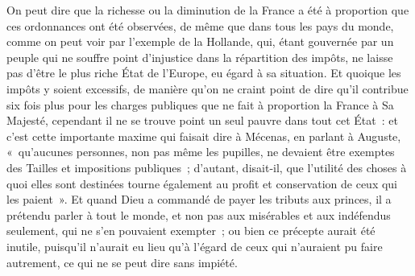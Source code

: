\documentclass[french,twoside]{book} %
\begin{document}
On peut dire que la richesse ou la diminution de la France a été à proportion que ces ordonnances ont été observées, de même que dans tous les pays du monde, comme on peut voir par l’exemple de la Hollande, qui, étant gouvernée par un peuple qui ne souffre point d’injustice dans la répartition des impôts, ne laisse pas d’être le plus riche État de l’Europe, eu égard à sa situation. Et quoique les impôts y soient excessifs, de manière qu’on ne craint point de dire qu’il contribue six fois plus pour les charges publiques que ne fait à proportion la France à Sa Majesté, cependant il ne se trouve point un seul pauvre dans tout cet État : et c’est cette importante maxime qui faisait dire à Mécenas, en parlant à Auguste, « qu’aucunes personnes, non pas même les pupilles, ne devaient être exemptes des Tailles et impositions publiques ; d’autant, disait-il, que l’utilité des choses à quoi elles sont destinées tourne également au profit et conservation de ceux qui les paient ». Et quand Dieu a commandé de payer les tributs aux princes, il a prétendu parler à tout le monde, et non pas aux misérables et aux indéfendus seulement, qui ne s’en pouvaient exempter ; ou bien ce précepte aurait été inutile, puisqu’il n’aurait eu lieu qu’à l’égard de ceux qui n’auraient pu faire autrement, ce qui ne se peut dire sans impiété.
\end{document}
